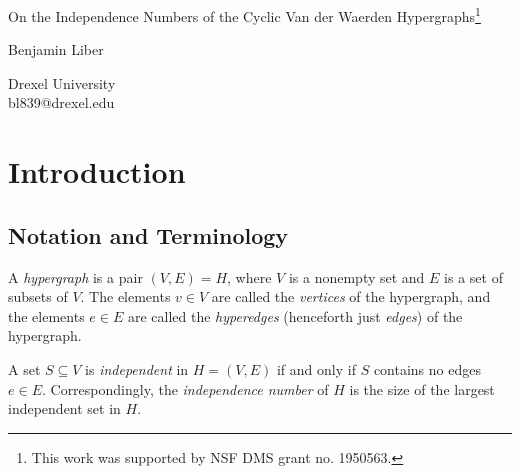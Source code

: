 \documentclass{article}
\theoremstyle{definition}
\theoremstyle{remark}
\begin{document}
\Large
 \begin{center}
On the Independence Numbers of the Cyclic Van der Waerden Hypergraphs\footnote{This work was supported by NSF DMS grant no. 1950563.} 

\hspace{10pt}


\large
Benjamin Liber

\hspace{10pt}

\small  
Drexel University \\
bl839@drexel.edu\\

\end{center}

\begin{abstract}
    Building upon the work of Berglund (2018), we establish a method for constructing subsets $B \subseteq \mathbb{Z}_{mk}$ such that $B$ does not contain any $k$-term cyclic arithmetic progressions mod $mk$, where $m,k \in \mathbb{Z}^+$ with $k \geq 3$. This construction thereby provides concrete lower bounds for the maximum size of such subsets. Additionally, it allows us to tightly bound specific chromatic numbers $\chi(mk,k)$ of $\mathbb{Z}_{mk}$ and helps increase the lower bounds of certain cyclic Van der Waerden numbers $W_{c}(k,r)$, originally introduced by Burkert and Johnson (2011) as a way of bounding the standard Van der Waerden numbers $W(k,r)$ from below for $r \geq 2$.
\end{abstract}

\normalsize
\color{black}
\section{Introduction}

\subsection{Notation and Terminology}

A \textit{hypergraph} is a pair $(V,E) = H$, where $V$ is a nonempty set and $E$ is a set of subsets of $V$. The elements $v \in V$ are called the \textit{vertices} of the hypergraph, and the elements $e \in E$ are called the \textit{hyperedges} (henceforth just \textit{edges}) of the hypergraph. 

A set $S \subseteq V$ is \textit{independent} in $H = (V,E)$ if and only if $S$ contains no edges $e \in E$. Correspondingly, the \textit{independence number} of $H$ is the size of the largest independent set in $H$. 
\end{document}
